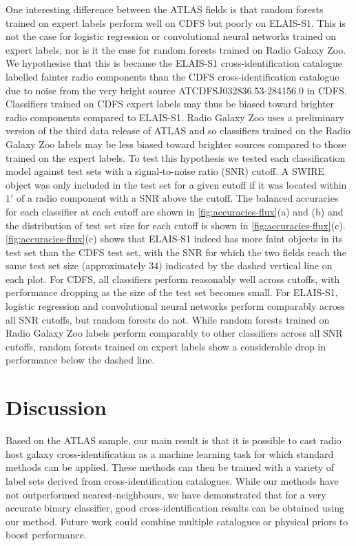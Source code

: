 \documentclass[fleqn,usenatbib,usedcolumn]{mnras}
\newcommand{\edited}[1]{#1}
\begin{document}
  One interesting difference between the ATLAS fields is that random forests
  trained on expert labels perform well on CDFS but poorly on ELAIS-S1. This
  is not the case for logistic regression or convolutional neural networks
  trained on expert labels, nor is it the case for random forests trained on
  Radio Galaxy Zoo. We hypothesise that this is because the ELAIS-S1
  cross-identification catalogue \citep{middelberg08} labelled fainter radio
  components than the CDFS cross-identification catalogue \citep{norris06} due
  to noise from the very bright source
  ATCDFS\textunderscore{}J032836.53-284156.0 in CDFS. Classifiers trained on
  CDFS expert labels may thus be biased toward brighter radio components
  compared to ELAIS-S1. Radio Galaxy Zoo uses a preliminary version of the third data release of ATLAS
  \citep{franzen15} and so classifiers trained on the Radio Galaxy Zoo labels
  may be less biased toward brighter sources compared to those trained on the
  expert labels. To test this hypothesis we tested each classification model against
  test sets with a signal-to-noise ratio (SNR) cutoff. A SWIRE object was only
  included in the test set for a given cutoff if it was located within $1'$ of
  a radio component with a SNR above the cutoff. The balanced accuracies for
  each classifier at each cutoff are shown in \autoref{fig:accuracies-flux}(a)
  and (b) and the distribution of test set size for each cutoff is shown in
  \autoref{fig:accuracies-flux}(c). \autoref{fig:accuracies-flux}(c) shows
  that ELAIS-S1 indeed has more faint objects in its test set than the CDFS test set, with the SNR for
  which the two fields reach the same test set size (approximately $34$)
  indicated by the dashed vertical line on each plot. For CDFS, all
  classifiers perform reasonably well across cutoffs, with performance
  dropping as the size of the test set becomes small. For ELAIS-S1, logistic
  regression and convolutional neural networks perform comparably across all
  SNR cutoffs, but random forests do not. While random forests trained on
  Radio Galaxy Zoo labels perform comparably to other classifiers across all
  SNR cutoffs, random forests trained on expert labels show a considerable
  drop in performance below the dashed line.

\section{Discussion}

  \edited{Based on the ATLAS sample}, our main result is that it is possible
  to cast radio host galaxy cross-identification as a machine learning task
  for which standard methods can be applied. These methods can then be trained
  with a variety of label sets derived from cross-identification catalogues.
  While our methods have not outperformed nearest-neighbours, we have demonstrated that
  for a very accurate binary classifier, good cross-identification results can
  be obtained using our method. Future work could combine multiple catalogues
  or physical priors to boost performance.
\end{document}
